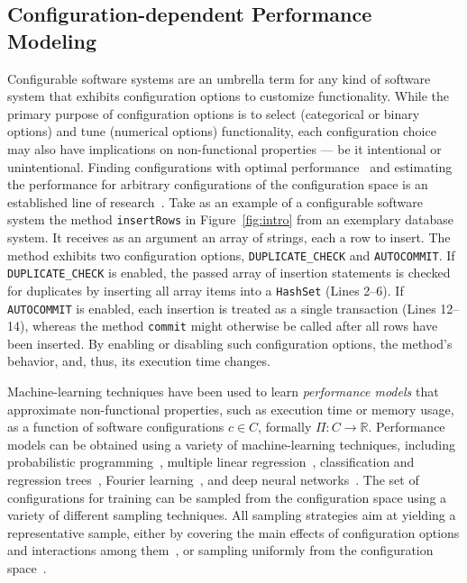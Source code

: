 \subsection{Configuration-dependent Performance Modeling}
Configurable software systems are an umbrella term for any kind of software system that exhibits configuration options to customize functionality. 
While the primary purpose of configuration options is to select (categorical or binary options) and tune (numerical options) functionality, each configuration choice may also have implications on non-functional properties --- be it intentional or unintentional. Finding configurations with optimal performance~\cite{nairUsingBadLearners2017,nairFlash18,ohFindingNearoptimalConfigurations2017} and estimating the performance for arbitrary configurations of the configuration space is an established line of research~\cite{siegmundPerformanceinfluenceModelsHighly2015,haDeepPerf2019,perfAL,guoVariabilityawarePerformancePrediction2013,sarkarCostEfficientSamplingPerformance,guo_2018_data,fourier_learning_2015,perLasso}. 
Take as an example of a configurable software system the method \texttt{insertRows} in Figure~\ref{fig:intro} from an exemplary database system. It receives as an argument an array of strings, each a row to insert. 
The method exhibits two configuration options, \texttt{DUPLICATE\_CHECK} and  \texttt{AUTOCOMMIT}. If \texttt{DUPLICATE\_CHECK} is enabled, the passed array of insertion statements is checked for duplicates by  inserting all array items into a \texttt{HashSet} (\colorbox{duplicatecheck}{Lines 2--6}).
If \texttt{AUTOCOMMIT} is enabled, each insertion is treated as a single transaction (\colorbox{autocommit}{Lines 12–14}), whereas the method \texttt{commit} might otherwise be called  after  all rows have been inserted. By enabling or disabling such configuration options, the method's behavior, and, thus, its execution time changes.


Machine-learning techniques have been used to learn \emph{performance models} that approximate non-functional properties, such as execution time or memory usage, as a function of software configurations $c \in C$, formally $\Pi: C \rightarrow \mathbb{R}$.
Performance models can be obtained using a variety of machine-learning techniques, including probabilistic programming~\cite{dorn2020}, multiple linear regression~\cite{siegmundPerformanceinfluenceModelsHighly2015}, classification and regression trees~\cite{sarkarCostEfficientSamplingPerformance,guo_2018_data}, Fourier learning~\cite{fourier_learning_2015,perLasso}, and deep neural networks~\cite{haDeepPerf2019,perfAL}.
The set of configurations for training can be sampled from the configuration space using a variety of different sampling techniques. All sampling strategies aim at yielding a representative sample, either by covering the main effects of configuration options and interactions among them~\cite{siegmundPredictingPerformanceAutomated2012}, or sampling uniformly from the configuration space~\cite{ohFindingNearoptimalConfigurations2017,kaltenecker_distance-based_2019}.

